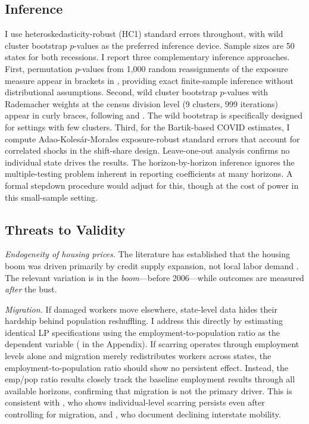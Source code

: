 \documentclass[12pt]{article}
\begin{document}
\subsection{Inference}

I use heteroskedasticity-robust (HC1) standard errors throughout, with wild cluster bootstrap $p$-values as the preferred inference device. Sample sizes are 50 states for both recessions. I report three complementary inference approaches. First, permutation $p$-values from 1,000 random reassignments of the exposure measure appear in brackets in , providing exact finite-sample inference without distributional assumptions. Second, wild cluster bootstrap $p$-values with Rademacher weights at the census division level (9 clusters, 999 iterations) appear in curly braces, following \citet{cameron2008bootstrap} and \citet{mackinnon2017wild}. The wild bootstrap is specifically designed for settings with few clusters. Third, for the Bartik-based COVID estimates, I compute Adao-Koles{\'a}r-Morales exposure-robust standard errors \citep{adao2019shift} that account for correlated shocks in the shift-share design. Leave-one-out analysis confirms no individual state drives the results. The horizon-by-horizon inference ignores the multiple-testing problem inherent in reporting coefficients at many horizons. A formal stepdown procedure \citep{romano2005stepwise} would adjust for this, though at the cost of power in this small-sample setting.

\subsection{Threats to Validity}

\textit{Endogeneity of housing prices.} The literature has established that the housing boom was driven primarily by credit supply expansion, not local labor demand \citep{mian2013household}. The relevant variation is in the \textit{boom}---before 2006---while outcomes are measured \textit{after} the bust.

\textit{Migration.} If damaged workers move elsewhere, state-level data hides their hardship behind population reshuffling. I address this directly by estimating identical LP specifications using the employment-to-population ratio as the dependent variable ( in the Appendix). If scarring operates through employment levels alone and migration merely redistributes workers across states, the employment-to-population ratio should show no persistent effect. Instead, the emp/pop ratio results closely track the baseline employment results through all available horizons, confirming that migration is not the primary driver. This is consistent with \citet{yagan2019employment}, who shows individual-level scarring persists even after controlling for migration, and \citet{dao2017regional}, who document declining interstate mobility.
\end{document}

